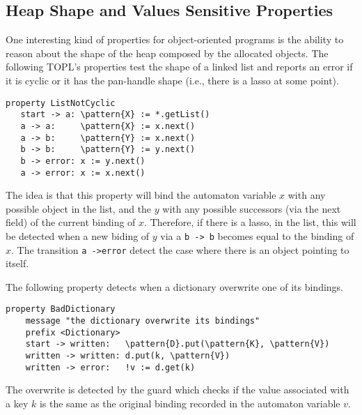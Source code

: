\documentclass{sigplanconf}[10pt] %
\newcommand{\noterg}[2]{\textcolor{gray}{[\textcolor{red}{#1}: #2]}}
\newcommand{\dd}[1]{\noterg{dd}{#1}}
\newcommand{\dinocomment}[1]{\dd{#1}}
\newcommand{\delimitVerbatim}{\par\nobreak\smallskip\noindent}
\newcommand{\pattern}[1]{\ensuremath{\mathtt{\underline{#1}}}}
\begin{document}


\subsection{Heap Shape and Values Sensitive Properties}
One interesting kind of properties for object-oriented programs is the ability to reason about the shape of 
the heap composed by the allocated objects. 
The following TOPL's properties test the shape of a linked list and reports an error if it is cyclic or it has the pan-handle shape (i.e., there is a lasso at some point). 
%
\delimitVerbatim
\begin{Verbatim}[commandchars=\\\{\}]
property ListNotCyclic
   start -> a: \pattern{X} := *.getList()
   a -> a:     \pattern{X} := x.next()
   a -> b:     \pattern{Y} := x.next()
   b -> b:     \pattern{Y} := y.next()
   b -> error: x := y.next()
   a -> error: x := x.next()
\end{Verbatim}
\delimitVerbatim
The idea is that this property will bind the automaton variable $x$
with any possible object in the list, and the $y$ with any possible successors (via the next field) 
of the current binding of $x$. Therefore, if there is a lasso, in the list, this will be detected when a new 
biding of $y$ via a \texttt{b -> b} becomes equal to the binding of $x$. The transition \texttt{a ->error} detect
the case where there is an object pointing to itself. 
%

The following property detects when a dictionary overwrite one of its bindings. 
\delimitVerbatim
\begin{Verbatim}[commandchars=\\\{\}]
 property BadDictionary
    message "the dictionary overwrite its bindings"
    prefix <Dictionary>
    start -> written:   \pattern{D}.put(\pattern{K}, \pattern{V})
    written -> written: d.put(k, \pattern{V})
    written -> error:   !v := d.get(k)
\end{Verbatim}
\delimitVerbatim
The overwrite is detected by the guard which checks if the value associated with a key $k$ is
the same as the original binding recorded in the automaton variable $v$.
\end{document}
